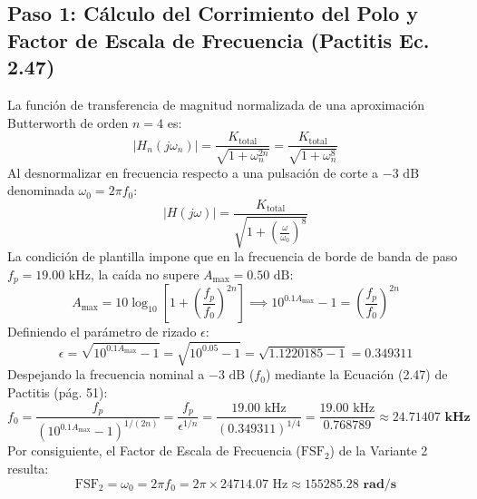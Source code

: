 \documentclass[a4paper,11pt]{article}
\begin{document}
\subsection{Paso 1: Cálculo del Corrimiento del Polo y Factor de Escala de Frecuencia (Pactitis Ec. 2.47)}
La función de transferencia de magnitud normalizada de una aproximación Butterworth de orden $n=4$ es:
\begin{equation}
|H_n(j\omega_n)| = \frac{K_{\text{total}}}{\sqrt{1 + \omega_n^{2n}}} = \frac{K_{\text{total}}}{\sqrt{1 + \omega_n^8}}
\end{equation}
Al desnormalizar en frecuencia respecto a una pulsación de corte a $-3\text{ dB}$ denominada $\omega_0 = 2\pi f_0$:
\begin{equation}
|H(j\omega)| = \frac{K_{\text{total}}}{\sqrt{1 + \left(\frac{\omega}{\omega_0}\right)^8}}
\end{equation}
La condición de plantilla impone que en la frecuencia de borde de banda de paso $f_p = 19.00\text{ kHz}$, la caída no supere $A_{\max} = 0.50\text{ dB}$:
\begin{equation}
A_{\max} = 10\log_{10}\left[ 1 + \left(\frac{f_p}{f_0}\right)^{2n} \right] \implies 10^{0.1 A_{\max}} - 1 = \left(\frac{f_p}{f_0}\right)^{2n}
\end{equation}
Definiendo el parámetro de rizado $\epsilon$:
\begin{equation}
\epsilon = \sqrt{10^{0.1 A_{\max}} - 1} = \sqrt{10^{0.05} - 1} = \sqrt{1.1220185 - 1} = \mathbf{0.349311}
\end{equation}
Despejando la frecuencia nominal a $-3\text{ dB}$ ($f_0$) mediante la Ecuación (2.47) de Pactitis (pág. 51):
\begin{equation}
f_0 = \frac{f_p}{\left(10^{0.1 A_{\max}} - 1\right)^{1/(2n)}} = \frac{f_p}{\epsilon^{1/n}} = \frac{19.00\text{ kHz}}{(0.349311)^{1/4}} = \frac{19.00\text{ kHz}}{0.768789} \approx \mathbf{24.71407\text{ kHz}}
\end{equation}
Por consiguiente, el Factor de Escala de Frecuencia ($\text{FSF}_2$) de la Variante 2 resulta:
\begin{equation}
\text{FSF}_2 = \omega_0 = 2\pi f_0 = 2\pi \times 24714.07\text{ Hz} \approx \mathbf{155285.28\text{ rad/s}}
\end{equation}
\end{document}
